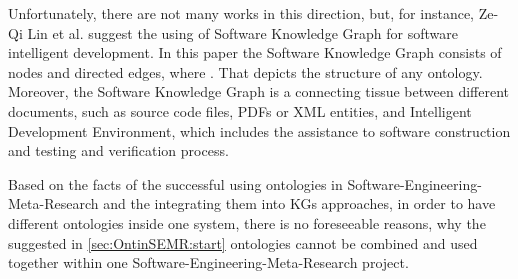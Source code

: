 		Unfortunately, there are not many works in this direction, but, for instance, Ze-Qi Lin et al.\cite{Lin17} suggest the using of Software Knowledge Graph for software intelligent development. In this paper the Software Knowledge Graph consists of nodes and directed edges, where \frqq\cite{Lin17}. That depicts the structure of any ontology. Moreover, the Software Knowledge Graph is a connecting tissue between different documents, such as source code files, PDFs or XML entities, and Intelligent Development Environment, which includes the assistance to software construction and testing and verification process. 
		
		Based on the facts of the successful using ontologies in Software-Engineering-Meta-Research and the integrating them into KGs approaches, in order to have different ontologies inside one system, there is no foreseeable reasons, why the suggested in \autoref{sec:OntinSEMR:start} ontologies cannot be combined and used together within one Software-Engineering-Meta-Research project.                                